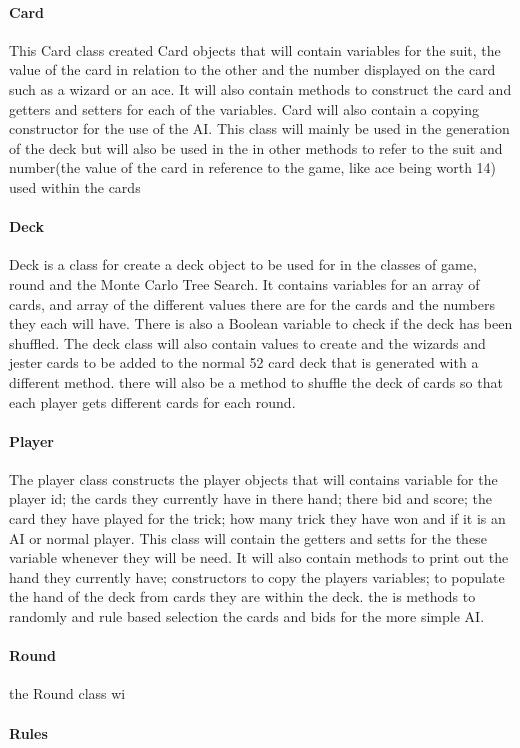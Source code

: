 \paragraph{Card}
This Card class created Card objects that will contain variables for the suit, the value of the card in relation to the other and the number displayed on the card such as a wizard or an ace. It will also contain methods to construct the card and getters and setters for each of the variables. Card will also contain a copying constructor for the use of the AI. This class will mainly be used in the generation of the deck but will also be used in the in other methods to refer to the suit and number(the value of the card in reference to the game, like ace being worth 14) used within the cards
\paragraph{Deck}
Deck is a class for create a deck object to be used for in the classes of game, round and the Monte Carlo Tree Search. It contains variables for an array of cards, and array of the different values there are for the cards and the numbers they each will have. There is also a Boolean variable to check if the deck has been shuffled. The deck class will also contain values to create and the wizards and jester cards to be added to the normal 52 card deck that is generated with a different method. there will also be a method to shuffle the deck of cards so that each player gets different cards for each round.
\paragraph{Player} 
The player class constructs the player objects that will contains variable for the player id; the cards they currently have in there hand; there bid and score; the card they have played for the trick; how many trick they have won and if it is an AI or normal player. This class will contain the getters and setts for the these variable whenever they will be need. It will also contain methods to print out the hand they currently have; constructors to copy the players variables; to populate the hand of the deck from cards they are within the deck. the is methods to randomly and rule based selection the cards and bids for the more simple AI.
\paragraph{Round}
the Round class wi
\paragraph{Rules}
